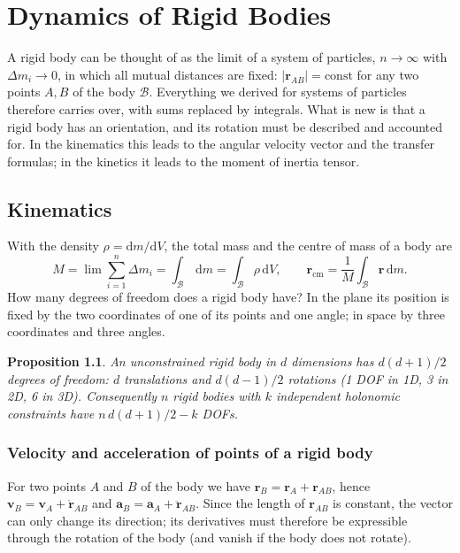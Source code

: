 \documentclass[11pt,a4paper,oneside]{report}
\numberwithin{equation}{chapter}
\newcommand{\vect}[1]{\bm{#1}}
\newcommand{\dd}{\,\mathrm{d}}
\newcommand{\cm}{\mathrm{cm}}
\theoremstyle{plain}
\newtheorem{proposition}[theorem]{Proposition}
\theoremstyle{definition}
\theoremstyle{remark}
\newcommand{\lecture}[2]{\marginpar{\raggedright\footnotesize\textsc{Lecture #1}\\\textit{#2}}}
\begin{document}
\chapter{Dynamics of Rigid Bodies}\label{ch:rigid}
\lecture{8}{12.10.2026}
A rigid body can be thought of as the limit of a system of particles, $n\to\infty$ with $\Delta m_i\to0$, in which all
mutual distances are fixed: $|\vect r_{AB}|=\text{const}$ for any two points $A,B$ of the body $\mathcal B$. Everything
we derived for systems of particles therefore carries over, with sums replaced by integrals. What is new is that a rigid
body has an orientation, and its rotation must be described and accounted for. In the kinematics this leads to the
angular velocity vector and the transfer formulas; in the kinetics it leads to the moment of inertia tensor.

\section{Kinematics}

With the density $\rho=\mathrm dm/\mathrm dV$, the total mass and the centre of mass of a body are
\begin{equation}
  M=\lim\sum_{i=1}^n\Delta m_i=\int_{\mathcal B}\dd m=\int_{\mathcal B}\rho\dd V,\qquad
  \vect r_\cm=\frac1M\int_{\mathcal B}\vect r\dd m .
\end{equation}
How many degrees of freedom does a rigid body have? In the plane its position is fixed by the two coordinates of one
of its points and one angle; in space by three coordinates and three angles.

\begin{proposition}
An unconstrained rigid body in $d$ dimensions has $d(d+1)/2$ degrees of freedom: $d$ translations and $d(d-1)/2$
rotations (1 DOF in 1D, 3 in 2D, 6 in 3D). Consequently $n$ rigid bodies with $k$ independent holonomic constraints
have $n\,d(d+1)/2-k$ DOFs.
\end{proposition}

\subsection{Velocity and acceleration of points of a rigid body}
For two points $A$ and $B$ of the body we have $\vect r_B=\vect r_A+\vect r_{AB}$, hence
$\vect v_B=\vect v_A+\dot{\vect r}_{AB}$ and $\vect a_B=\vect a_A+\ddot{\vect r}_{AB}$. Since the length of
$\vect r_{AB}$ is constant, the vector can only change its direction; its derivatives must therefore be expressible
through the rotation of the body (and vanish if the body does not rotate).
\end{document}

